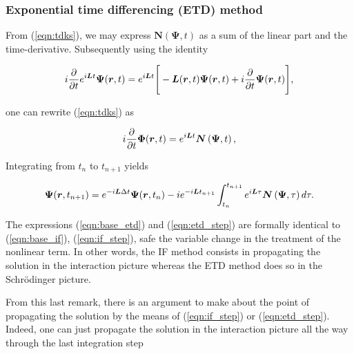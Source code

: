 \subsubsection{Exponential time differencing (ETD) method}

From (\ref{eqn:tdks}), we may express $\boldsymbol{N}(\boldsymbol{\Psi},t)$
as a sum of the linear part and the time-derivative. Subsequently
using the identity

\begin{equation}
   i\frac{\partial}{\partial t}
      e^{i\boldsymbol{L}t}\boldsymbol{\rm \Psi}(\boldsymbol{r},t) 
      = e^{i\boldsymbol{L}t}
    \Bigg[ 
    - \boldsymbol{L}(\boldsymbol{r},t)\boldsymbol{\rm \Psi}(\boldsymbol{r},t)
    + i\frac{\partial}{\partial t}
\boldsymbol{\Psi}(\boldsymbol{r},t)
    \Bigg],
\end{equation}

\noindent one can rewrite (\ref{eqn:tdks}) as 

\begin{equation}
   i\frac{\partial}{\partial t}\boldsymbol{\rm \Phi}(\boldsymbol{r},t) 
      = e^{i\boldsymbol{L}t}
    \boldsymbol{N}\left( \boldsymbol{\rm\Psi},t\right),
     \label{eqn:base_etd}
\end{equation}

\noindent Integrating from $t_n$ to $t_{n+1}$ yields

\begin{equation}
   \boldsymbol{\rm \Psi}(\boldsymbol{r},t_{n+1}) 
      = e^{-i\boldsymbol{L}\Delta t}
   \boldsymbol{\rm \Psi}(\boldsymbol{r},t_n) 
      -i e^{-i\boldsymbol{L}t_{n+1}}
      \int_{t_n}^{t_{n+1}} e^{i\boldsymbol{L}\tau}
    \boldsymbol{N}\left( \boldsymbol{\rm\Psi},\tau\right)d\tau.
     \label{eqn:etd_step}
\end{equation}

\noindent The expressions (\ref{eqn:base_etd}) and (\ref{eqn:etd_step})
are formally identical to (\ref{eqn:base_if}), (\ref{eqn:if_step}),
safe the variable change in the treatment of the nonlinear term.
In other words, the IF method consists in propagating the solution 
in the interaction picture whereas the ETD method does so in
the Schr\"odinger picture.

\vspace{20pt}

From this last remark, there is an argument to make about the point 
of propagating the solution by the means of (\ref{eqn:if_step}) or
(\ref{eqn:etd_step}). Indeed, one can just propagate 
the solution in the interaction picture all the way through the last 
integration step 

